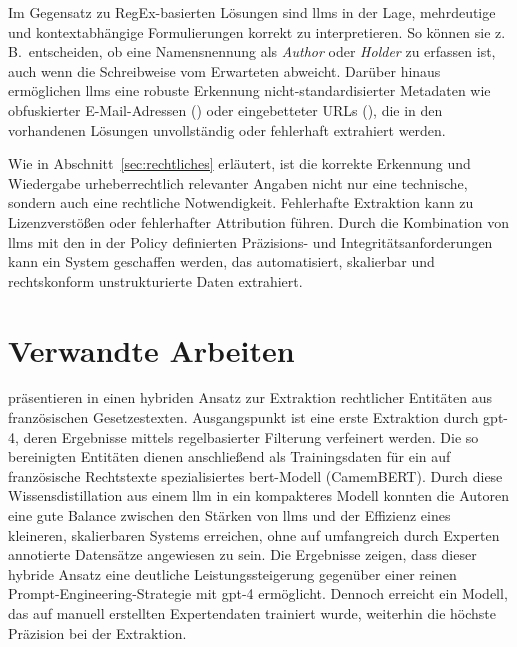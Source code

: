 Im Gegensatz zu RegEx-basierten Lösungen sind \glspl{llm} in der Lage, mehrdeutige und kontextabhängige Formulierungen korrekt zu interpretieren.
So können sie z.\,B.\ entscheiden, ob eine Namensnennung als \textit{Author} oder \textit{Holder} zu erfassen ist, auch wenn die Schreibweise vom Erwarteten abweicht.
Darüber hinaus ermöglichen \glspl{llm} eine robuste Erkennung nicht-standardisierter Metadaten wie obfuskierter E-Mail-Adressen () oder eingebetteter URLs (), die in den vorhandenen Lösungen unvollständig oder fehlerhaft extrahiert werden.

Wie in Abschnitt~\ref{sec:rechtliches} erläutert, ist die korrekte Erkennung und Wiedergabe urheberrechtlich relevanter Angaben nicht nur eine technische, sondern auch eine rechtliche Notwendigkeit.
Fehlerhafte Extraktion kann zu Lizenzverstößen oder fehlerhafter Attribution führen.
Durch die Kombination von \glspl{llm} mit den in der Policy definierten Präzisions- und Integritätsanforderungen kann ein System geschaffen werden, das automatisiert, skalierbar und rechtskonform unstrukturierte Daten extrahiert.


\section{Verwandte Arbeiten}\label{sec:verwandte-arbeiten}

\citeauthor{breton_empowering_2024} präsentieren in  einen hybriden Ansatz zur Extraktion rechtlicher Entitäten aus französischen Gesetzestexten.
Ausgangspunkt ist eine erste Extraktion durch \gls{gpt}-4, deren Ergebnisse mittels regelbasierter Filterung verfeinert werden.
Die so bereinigten Entitäten dienen anschließend als Trainingsdaten für ein auf französische Rechtstexte spezialisiertes \gls{bert}-Modell (CamemBERT). Durch diese Wissensdistillation aus einem \gls{llm} in ein kompakteres Modell konnten die Autoren eine gute Balance zwischen den Stärken von \glspl{llm} und der Effizienz eines kleineren, skalierbaren Systems erreichen, ohne auf umfangreich durch Experten annotierte Datensätze angewiesen zu sein.
Die Ergebnisse zeigen, dass dieser hybride Ansatz eine deutliche Leistungssteigerung gegenüber einer reinen Prompt-Engineering-Strategie mit \gls{gpt}-4 ermöglicht.
Dennoch erreicht ein Modell, das auf manuell erstellten Expertendaten trainiert wurde, weiterhin die höchste Präzision bei der Extraktion\autocite{breton_empowering_2024}.


